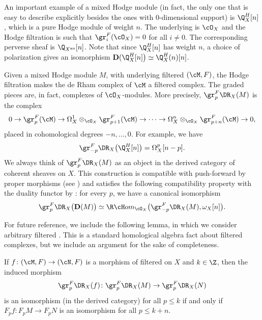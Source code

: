 An important example of a mixed Hodge module (in fact, the only one that is easy to describe explicitly besides the ones with $0$-dimensional support) is $\Q_X^H[n]$, which is a pure Hodge module of weight $n$.
The underlying \DXmodule is $\cO_X$ and the Hodge filtration is such that $\gr^F_i(\cO_X)=0$ for all $i\neq 0$. The corresponding perverse sheaf is $\Q_{X^\mathrm{an}}[n]$.
Note that since $\Q_X^H[n]$ has weight $n$, a choice of polarization gives an isomorphism ${\mathbf D}(\Q_X^H[n]\big)\simeq\Q_X^H(n)[n]$.

Given a mixed Hodge module $M$, with underlying filtered \DXmodule $(\cM,F)$, the Hodge filtration makes the de Rham complex of $\cM$ a filtered complex. The graded pieces
are, in fact, complexes of $\cO_X$-modules. More precisely, $\gr_p^F\DR_X(M)$ is the complex
\[0\to \gr_p^F(\cM)\to\Omega_X^1\otimes_{\cO_X}\gr_{p+1}^F(\cM)\to \cdots\to \Omega_X^n\otimes_{\cO_X}\gr_{p+n}^F(\cM)\to 0,\]
placed in cohomological degrees $-n,\ldots,0$. For example, we have
\[\gr_{-p}^F\DR_X\big(\Q_X^H[n]\big)=\Omega_X^p[n-p].\]
We always think of $\gr^F_p\DR_X(M)$ as an object in the derived category of coherent sheaves on $X$.
This construction is compatible with push-forward by proper morphisms (see \cite[\S 2.3.7]{Saito_MHP}) and satisfies the following compatibility property with the duality functor
by \cite[.5 \& 2.4.11]{Saito_MHP}: for every $p$, we have a canonical isomorphism
\begin{equation}\label{eq_compat_with_duality}
\gr^F_p\DR_X\big({\mathbf D}(M)\big)\simeq \R\cH om_{\cO_X}\big(\gr^F_{-p}\DR_X(M),\omega_X[n]\big).
\end{equation}

For future reference, we include the following lemma, in which we consider arbitrary filtered \DXmodules. This is a standard homological algebra fact
about filtered complexes, but we include an argument for the sake of completeness.

\begin{lem}\label{general_lemma}
If $f\colon (\cM,F)\to (\cN,F)$
is a morphism of filtered \DXmodules on $X$ and $k\in\Z$, then the induced morphism
\[\gr^F_p\DR_X(f)\colon \gr^F_p\DR_X(M)\to \gr^F_p\DR_X(N)\] is an isomorphism (in the derived category) for all $p\leq k$
if and only if $F_pf\colon F_pM\to F_pN$ is an isomorphism for all $p\leq k+n$.
\end{lem}

